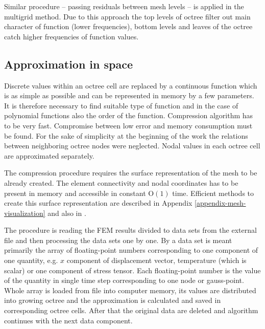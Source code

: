 Similar procedure -- passing residuals between mesh levels -- is applied in the multigrid method. Due to this approach the top levels of octree filter out main character of function (lower frequencies), bottom levels and leaves of the octree catch higher frequencies of function values.


\subsection{Approximation in space}
\label{sec:approximation-in-space}

Discrete values within an octree cell are replaced by a continuous function which is as simple as possible and can be represented in memory by a few parameters. It is therefore necessary to find suitable type of function and in the case of polynomial functions also the order of the function. Compression algorithm has to be very fast. Compromise between low error and memory consumption must be found. For the sake of simplicity at the beginning of the work the relations between neighboring octree nodes were neglected. Nodal values in each octree cell are approximated separately.

The compression procedure requires the surface representation of the mesh to be already created. The element connectivity and nodal coordinates has to be present in memory and accessible in constant $\mathrm{O}(1)$ time. Efficient methods to create this surface representation are described in Appendix \ref{appendix-mesh-visualization} and also in \cite{XXX}.

The procedure is reading the FEM results divided to data sets from the external file and then processing the data sets one by one. By a data set is meant primarily the array of floating-point numbers corresponding to one component of one quantity, e.g. $x$ component of displacement vector, temperature (which is scalar) or one component of stress tensor. Each floating-point number is the value of the quantity in single time step corresponding to one node or gauss-point. Whole array is loaded from file into computer memory, its values are distributed into growing octree and the approximation is calculated and saved in corresponding octree cells. After that the original data are deleted and algorithm continues with the next data component.

